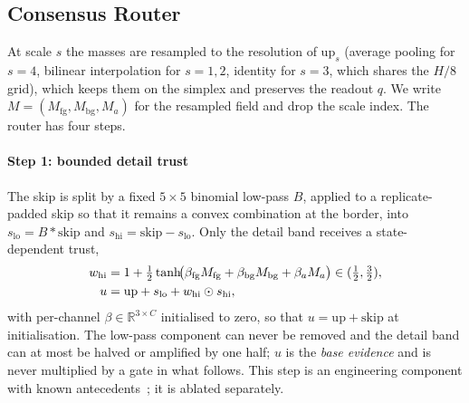 \subsection{Consensus Router}
\label{sec:router}

At scale $s$ the masses are resampled to the resolution of $\mathrm{up}_s$ (average pooling for $s=4$, bilinear interpolation for $s=1,2$, identity for $s=3$, which shares the $H/8$ grid), which keeps them on the simplex and preserves the readout $q$. We write $M=(M_{\mathrm{fg}},M_{\mathrm{bg}},M_a)$ for the resampled field and drop the scale index. The router has four steps.

\paragraph*{Step 1: bounded detail trust} The skip is split by a fixed $5\times5$ binomial low-pass $B$, applied to a replicate-padded skip so that it remains a convex combination at the border, into $s_{\mathrm{lo}}=B\ast\mathrm{skip}$ and $s_{\mathrm{hi}}=\mathrm{skip}-s_{\mathrm{lo}}$. Only the detail band receives a state-dependent trust,
\begin{align}
w_{\mathrm{hi}} &= 1+\tfrac12\tanh\!\bigl(\beta_{\mathrm{fg}}M_{\mathrm{fg}}+\beta_{\mathrm{bg}}M_{\mathrm{bg}}+\beta_{a}M_a\bigr)\in(\tfrac12,\tfrac32),\notag\\
u &= \mathrm{up}+s_{\mathrm{lo}}+w_{\mathrm{hi}}\odot s_{\mathrm{hi}},
\label{eq:detail}
\end{align}
with per-channel $\beta\in\mathbb R^{3\times C}$ initialised to zero, so that $u=\mathrm{up}+\mathrm{skip}$ at initialisation. The low-pass component can never be removed and the detail band can at most be halved or amplified by one half; $u$ is the \emph{base evidence} and is never multiplied by a gate in what follows. This step is an engineering component with known antecedents~\cite{chen2025freqfusion,park2019spade}; it is ablated separately.

